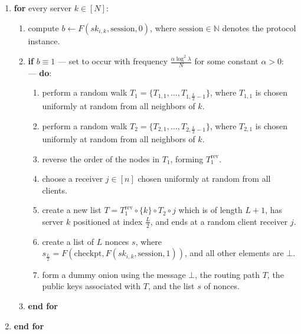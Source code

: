 \begin{enumerate}
    \item \textbf{for} every server $k \in [N]$:
    \begin{enumerate}
        \item compute $b \leftarrow F(sk_{i,k}, \text{session}, 0)$, where $\text{session} \in \mathbb{N}$ denotes the protocol instance.
        \item \textbf{if} $b \equiv 1$ — set to occur with frequency $\frac{\alpha \log^2 \lambda}{N}$ for some constant $\alpha > 0$:\\
        --- \textbf{do}:
        \begin{enumerate}
            \item perform a random walk $T_1 = \{T_{1,1}, \dots, T_{1, \frac{L}{2} - 1}\}$, where $T_{1,1}$ is chosen uniformly at random from all neighbors of $k$. 
            \item perform a random walk $T_2 = \{T_{2,1}, \dots, T_{2, \frac{L}{2} - 1}\}$, where $T_{2,1}$ is chosen uniformly at random from all neighbors of $k$. 
            \item reverse the order of the nodes in $T_1$, forming $T^{\text{rev}}_1$.
            \item choose a receiver $j \in [n]$ chosen uniformly at random from all clients.
            \item create a new list $T = T^{\text{rev}}_1 \circ \{ k \} \circ T_2 \circ j$ which is of length $L + 1$, has server $k$ positioned at index $\frac{L}{2}$, and ends at a random client receiver $j$.
            \item create a list of $L$ nonces $s$, where $s_{\frac{L}{2}} = F(\text{checkpt}, F(sk_{i,k}, \text{session}, 1))$, and all other elements are $\bot$.
            \item form a dummy onion using the message $\bot$, the routing path $T$, the public keys associated with $T$, and the list $s$ of nonces.
        \end{enumerate}
        \item \textbf{end for}
    \end{enumerate}
    \item \textbf{end for}\\\\
 \end{enumerate}


